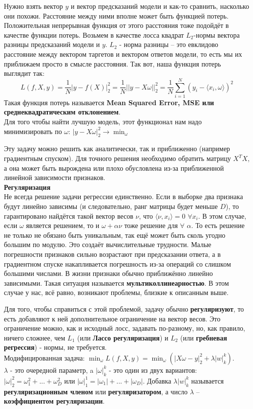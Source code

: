 Нужно взять вектор $y$ и вектор предсказаний модели и как-то сравнить, насколько они похожи. Расстояние между ними вполне может быть функцией потерь. Положительная непрерывная функция от этого расстояния тоже подойдёт в качестве функции потерь. Возьмем в качестве лосса квадрат $L_2$-нормы вектора разницы предсказаний модели и $y$. $L_2$ - норма разницы – это евклидово расстояние между вектором таргетов и вектором ответов модели, то есть мы их приближаем просто в смысле расстояния.
Так вот, наша функция потерь выглядит так:
\begin{equation*}
    L(f,X,y)=\frac{1}{N}|y-f(X)|_2^2=\frac{1}{N}||y-X\omega||_2^2 =\frac{1}{N}\sum_{i=1}^{N} (y_i-\langle x_i,\omega\rangle)^2
\end{equation*}
Такая функция потерь называется \textbf{Mean Squared Error, MSE или среднеквадратическим отклонением}. \\
Для того чтобы найти лучшую модель, этот функционал нам надо минимизировать по $\omega$: $|y-X\omega|_2^2 \xrightarrow{} \min_{\omega}$

Эту задачу можно решить как аналитически, так и приближенно (например градиентным спуском).
Для точного решения необходимо обратить матрицу $X^TX$, а она может быть вырождена или плохо обусловлена из-за приближенной линейной зависимости признаков. \\
\textbf{Регуляризация} \\
Не всегда решение задачи регрессии единственно. Если в выборке два признака будут линейно зависимы (и следовательно, ранг матрицы будет меньше $D$), то гарантировано найдётся такой вектор весов $\nu$, что $\langle\nu,x_i\rangle=0  
 $ $\forall x_i$. В этом случае, если $\omega$ является решением, то и $\omega+\alpha\nu$ тоже решение для $\forall$ $\alpha$. То есть решение не только не обязано быть уникальным, так ещё может быть сколь угодно большим по модулю. Это создаёт вычислительные трудности. Малые погрешности признаков сильно возрастают при предсказании ответа, а в градиентном спуске накапливается погрешность из-за операций со слишком большими числами. В жизни признаки обычно приближённо линейно зависимыми. Такая ситуация называется \textbf{мультиколлинеарностью}. В этом случае у нас, всё равно, возникают проблемы, близкие к описанным выше. 
\par Для того, чтобы справиться с этой проблемой, задачу обычно \textbf{регуляризуют}, то есть добавляют к ней дополнительное ограничение на вектор весов. Это ограничение можно, как и исходный лосс, задавать по-разному, но, как правило, ничего сложнее, чем $L_1$ (или \textbf{Лассо регуляризация}) и $L_2$ (или \textbf{гребневая регрессия}) - нормы, не требуется. \\
Модифицированная задача: $\min_{\omega}L(f, X, y) = \min_{\omega}(|X\omega-y|_2^2+\lambda|w|_k^k)$. \\
$\lambda$ - это очередной параметр, a $|\omega|_k^k$ - это один из двух вариантов:
$|\omega|_2^2=\omega_1^2+...+\omega_D^2$ или $ |\omega|_1^1=|\omega_1|+...+|\omega_D|$.
Добавка $\lambda|w|_k^k$ называется \textbf{регуляризационным членом} или \textbf{регуляризатором}, а число $\lambda$ – \textbf{коэффициентом регуляризации}.

